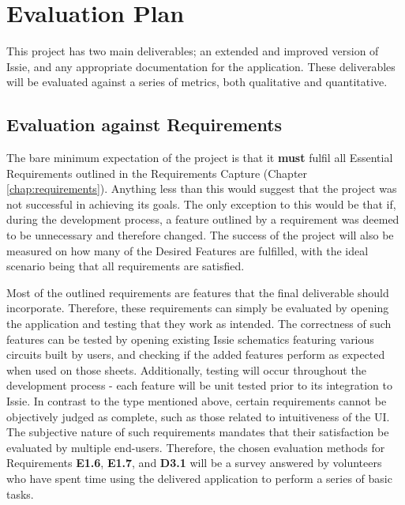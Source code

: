 \chapter{Evaluation Plan}
This project has two main deliverables; an extended and improved version of Issie, and any appropriate documentation for the application. These deliverables will be evaluated against a series of metrics, both qualitative and quantitative.
\section{Evaluation against Requirements}
The bare minimum expectation of the project is that it \textbf{must} fulfil all Essential Requirements outlined in the Requirements Capture (Chapter \ref{chap:requirements}). Anything less than this would suggest that the project was not successful in achieving its goals. The only exception to this would be that if, during the development process, a feature outlined by a requirement was deemed to be unnecessary and therefore changed. The success of the project will also be measured on how many of the Desired Features are fulfilled, with the ideal scenario being that all requirements are satisfied. 

Most of the outlined requirements are features that the final deliverable should incorporate. Therefore, these requirements can simply be evaluated by opening the application and testing that they work as intended. The correctness of such features can be tested by opening existing Issie schematics featuring various circuits built by users, and checking if the added features perform as expected when used on those sheets. Additionally, testing will occur throughout the development process - each feature will be unit tested prior to its integration to Issie. 
In contrast to the type mentioned above, certain requirements cannot be objectively judged as complete, such as those related to intuitiveness of the UI. The subjective nature of such requirements mandates that their satisfaction be evaluated by multiple end-users. Therefore, the chosen evaluation methods for Requirements \textbf{E1.6}, \textbf{E1.7}, and \textbf{D3.1} will be a survey answered by volunteers who have spent time using the delivered application to perform a series of basic tasks.

